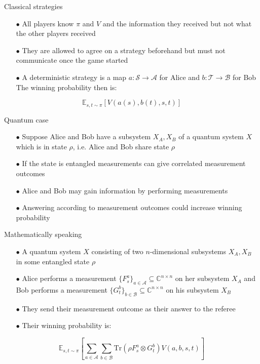\begin{frame}{Classical strategies}
    \begin{itemize}
        \item[$\bullet$] All players know $\pi$ and $V$ and the information they received but not what the other players received
        \item[$\bullet$] They are allowed to agree on a strategy beforehand \pause but must not communicate once the game started
        \item[$\bullet$] A deterministic strategy is a map $a : \mathcal{S} \rightarrow \mathcal{A}$ for Alice and $b : \mathcal{T} \rightarrow \mathcal{B}$ for Bob
        The winning probability then is:
    \end{itemize}
    \begin{equation*}
        \mathbb{E}_{s,t \sim \pi} \left[ V(a(s),b(t),s,t) \right]
\end{equation*}
\end{frame}

\begin{frame}{Quantum case}
\begin{itemize}
    \item[$\bullet$] Suppose Alice and Bob have a subsystem $X_A, X_B$ of a quantum system $X$ which is in state $\rho$, i.e. Alice and Bob share state $\rho$
    \item[$\bullet$] If the state is entangled measurements can give correlated measurement outcomes
    \item[$\bullet$] Alice and Bob may gain information by performing measurements
    \item[$\bullet$] Answering according to measurement outcomes could increase winning probability 
\end{itemize}
\end{frame}


\begin{frame}{Mathematically speaking}
\begin{itemize}
    \item[$\bullet$] A quantum system $X$ consisting of two $n$-dimensional subsystems $X_A, X_B$ in some entangled state $\rho$
    \item[$\bullet$] Alice performs a measurement $\{ F_s^a \}_{a\in \mathcal{A}}\subseteq \mathbb{C}^{n \times n}$ on her subsystem $X_A$ and Bob performs a measurement $\{ G_t^b\}_{b \in \mathcal{B}} \subseteq \mathbb{C}^{n \times n}$ on his subsystem $X_B$
    \item[$\bullet$] They send their measurement outcome as their answer to the referee
    \item[$\bullet$] Their winning probability is:
\end{itemize}
\begin{equation*}
\mathbb{E}_{s,t \sim \pi} \left[ \sum_{a \in \mathcal{A}} \sum_{b \in \mathcal{B}} \text{Tr}(\rho F_s^a \otimes G_t^b) V(a,b,s,t) \right]
\end{equation*}  
\end{frame}

